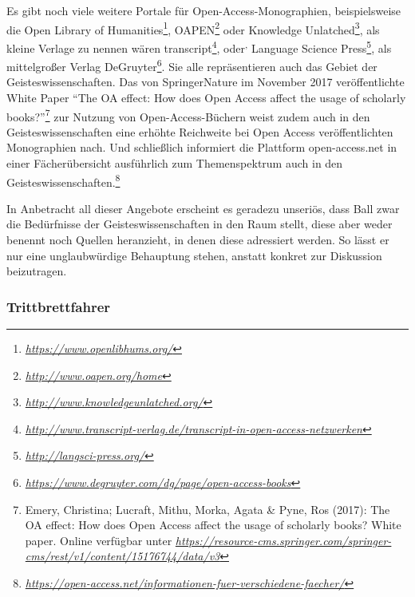 \documentclass[a4paper,
fontsize=11pt,
oneside,
numbers=noperiodatend,
parskip=half-,
bibliography=totoc,
final
]{scrartcl}
\begin{document}
Es gibt noch viele weitere Portale für Open-Access-Monographien,
beispielsweise die Open Library of Humanities\footnote{\href{https://www.openlibhums.org/}{\emph{https://www.openlibhums.org/}}},
OAPEN\footnote{\href{http://www.oapen.org/home}{\emph{http://www.oapen.org/home}}}
oder Knowledge Unlatched\footnote{\href{http://www.knowledgeunlatched.org/}{\emph{http://www.knowledgeunlatched.org/}}},
als kleine Verlage zu nennen wären transcript\footnote{\href{http://www.transcript-verlag.de/transcript-in-open-access-netzwerken}{\emph{http://www.transcript-verlag.de/transcript-in-open-access-netzwerken}}},
oder\textsuperscript{,} Language Science Press\footnote{\href{http://langsci-press.org/}{\emph{http://langsci-press.org/}}},
als mittelgroßer Verlag DeGruyter\footnote{\href{https://www.degruyter.com/dg/page/open-access-books}{\emph{https://www.degruyter.com/dg/page/open-access-books}}}.
Sie alle repräsentieren auch das Gebiet der Geisteswissenschaften. Das
von SpringerNature im November 2017 veröffentlichte White Paper
\enquote{The OA effect: How does Open Access affect the usage of
scholarly books?}\footnote{Emery, Christina; Lucraft, Mithu, Morka,
  Agata \& Pyne, Ros (2017): The OA effect: How does Open Access affect
  the usage of scholarly books? White paper. Online verfügbar unter
  \href{https://resource-cms.springer.com/springer-cms/rest/v1/content/15176744/data/v3}{\emph{https://resource-cms.springer.com/springer-cms/rest/v1/content/15176744/data/v3}}}
zur Nutzung von Open-Access-Büchern weist zudem auch in den
Geisteswissenschaften eine erhöhte Reichweite bei Open Access
veröffentlichten Monographien nach. Und schließlich informiert die
Plattform open-access.net in einer Fächerübersicht ausführlich zum
Themenspektrum auch in den Geisteswissenschaften.\footnote{\href{https://open-access.net/informationen-fuer-verschiedene-faecher/}{\emph{https://open-access.net/informationen-fuer-verschiedene-faecher/}}}

In Anbetracht all dieser Angebote erscheint es geradezu unseriös, dass
Ball zwar die Bedürfnisse der Geisteswissenschaften in den Raum stellt,
diese aber weder benennt noch Quellen heranzieht, in denen diese
adressiert werden. So lässt er nur eine unglaubwürdige Behauptung
stehen, anstatt konkret zur Diskussion beizutragen.

\subsubsection{Trittbrettfahrer}\label{trittbrettfahrer}
\end{document}
